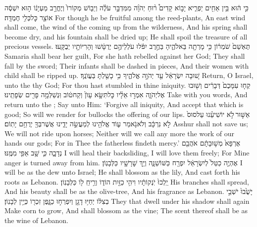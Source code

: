 {כִּ֣י ה֔וּא בֵּ֥ין אַחִ֖ים יַפְרִ֑יא יָב֣וֹא קָדִים֩ ר֨וּחַ יְהֹוָ֜ה מִמִּדְבָּ֣ר עֹלֶ֗ה וְיֵב֤וֹשׁ מְקוֹרוֹ֙ וְיֶחֱרַ֣ב מַעְיָנ֔וֹ ה֣וּא יִשְׁסֶ֔ה אוֹצַ֖ר כׇּל\maqqaf כְּלִ֥י חֶמְדָּֽה׃}
{For though he be fruitful among the reed-plants, An east wind shall come, the wind of the \lord\space coming up from the wilderness, And his spring shall become dry, and his fountain shall be dried up; He shall spoil the treasure of all precious vessels.}
\newperek
{}
{תֶּאְשַׁם֙ שֹׁמְר֔וֹן כִּ֥י מָרְתָ֖ה בֵּאלֹהֶ֑יהָ בַּחֶ֣רֶב יִפֹּ֔לוּ עֹלְלֵיהֶ֣ם יְרֻטָּ֔שׁוּ וְהָרִיּוֹתָ֖יו יְבֻקָּֽעוּ׃ \petucha }
{Samaria shall bear her guilt, For she hath rebelled against her God; They shall fall by the sword; Their infants shall be dashed in pieces, And their women with child shall be ripped up.}
{שׁ֚וּבָה יִשְׂרָאֵ֔ל עַ֖ד יְהֹוָ֣ה אֱלֹהֶ֑יךָ כִּ֥י כָשַׁ֖לְתָּ בַּעֲוֺנֶֽךָ׃}
{Return, O Israel, unto the \lord\space thy God; For thou hast stumbled in thine iniquity.}
{קְח֤וּ עִמָּכֶם֙ דְּבָרִ֔ים וְשׁ֖וּבוּ אֶל\maqqaf יְהֹוָ֑ה אִמְר֣וּ אֵלָ֗יו כׇּל\maqqaf תִּשָּׂ֤א עָוֺן֙ וְקַח\maqqaf ט֔וֹב וּֽנְשַׁלְּמָ֥ה פָרִ֖ים שְׂפָתֵֽינוּ׃}
{Take with you words, And return unto the \lord; Say unto Him: ‘Forgive all iniquity, And accept that which is good; So will we render for bullocks the offering of our lips.}
{אַשּׁ֣וּר \legarmeh  לֹ֣א יוֹשִׁיעֵ֗נוּ עַל\maqqaf סוּס֙ לֹ֣א נִרְכָּ֔ב וְלֹא\maqqaf נֹ֥אמַר ע֛וֹד אֱלֹהֵ֖ינוּ לְמַעֲשֵׂ֣ה יָדֵ֑ינוּ אֲשֶׁר\maqqaf בְּךָ֖ יְרֻחַ֥ם יָתֽוֹם׃}
{Asshur shall not save us; We will not ride upon horses; Neither will we call any more the work of our hands our gods; For in Thee the fatherless findeth mercy.’}
{אֶרְפָּא֙ מְשׁ֣וּבָתָ֔ם אֹהֲבֵ֖ם נְדָבָ֑ה כִּ֛י שָׁ֥ב אַפִּ֖י מִמֶּֽנּוּ׃}
{I will heal their backsliding, I will love them freely; For Mine anger is turned away from him.}
{אֶהְיֶ֤ה כַטַּל֙ לְיִשְׂרָאֵ֔ל יִפְרַ֖ח כַּשּׁוֹשַׁנָּ֑ה וְיַ֥ךְ שׇׁרָשָׁ֖יו כַּלְּבָנֽוֹן׃}
{I will be as the dew unto Israel; He shall blossom as the lily, And cast forth his roots as Lebanon.}
{יֵֽלְכוּ֙ יֹֽנְקוֹתָ֔יו וִיהִ֥י כַזַּ֖יִת הוֹד֑וֹ וְרֵ֥יחַֽ ל֖וֹ כַּלְּבָנֽוֹן׃}
{His branches shall spread, And his beauty shall be as the olive-tree, And his fragrance as Lebanon.}
{יָשֻׁ֙בוּ֙ יֹשְׁבֵ֣י בְצִלּ֔וֹ יְחַיּ֥וּ דָגָ֖ן וְיִפְרְח֣וּ כַגָּ֑פֶן זִכְר֖וֹ כְּיֵ֥ין לְבָנֽוֹן׃}
{They that dwell under his shadow shall again Make corn to grow, And shall blossom as the vine; The scent thereof shall be as the wine of Lebanon.}

